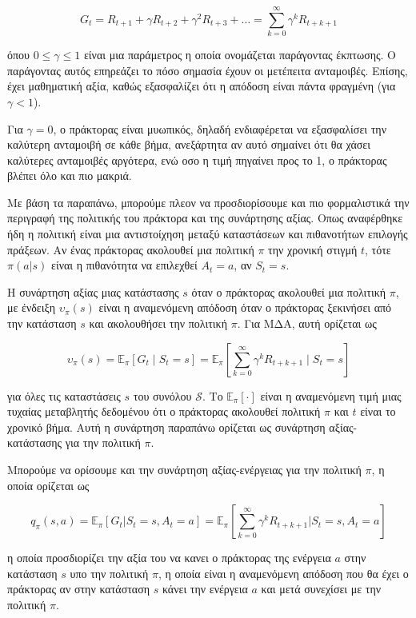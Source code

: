 \begin{equation}
    G_t = R_{t+1} + γ R_{t+2} + γ^2 R_{t+3} + \ldots = \sum_{k=0}^{\infty}γ^k R_{t+k+1}
\end{equation}

όπου $ 0 \leq γ \leq 1$ είναι μια παράμετρος η οποία ονομάζεται παράγοντας έκπτωσης.
Ο παράγοντας αυτός επηρεάζει το πόσο σημασία έχουν οι μετέπειτα ανταμοιβές.
Επίσης, έχει μαθηματική αξία, καθώς εξασφαλίζει ότι η απόδοση είναι πάντα φραγμένη (για $γ < 1$).

Για $γ = 0$, ο πράκτορας είναι μυωπικός, δηλαδή ενδιαφέρεται να εξασφαλίσει την καλύτερη ανταμοιβή σε κάθε βήμα,
ανεξάρτητα αν αυτό σημαίνει ότι θα χάσει καλύτερες ανταμοιβές αργότερα, ενώ οσο η τιμή πηγαίνει προς το 1,
ο πράκτορας βλέπει όλο και πιο μακριά.

Με βάση τα παραπάνω, μπορούμε πλεον να προσδιορίσουμε και πιο φορμαλιστικά την περιγραφή της πολιτικής του πράκτορα και της συνάρτησης αξίας.
Οπως αναφέρθηκε ήδη η πολιτική είναι μια αντιστοίχηση μεταξύ καταστάσεων και πιθανοτήτων επιλογής πράξεων.
Αν ένας πράκτορας ακολουθεί μια πολιτική $π$ την χρονική στιγμή $t$,
τότε $π(a|s)$ είναι η πιθανότητα να επιλεχθεί $A_t = a$, αν $S_t =s$.

Η συνάρτηση αξίας μιας κατάστασης $s$ όταν ο πράκτορας ακολουθεί μια πολιτική $π$,
με ένδειξη $υ_π(s)$ είναι η αναμενόμενη απόδοση όταν ο πράκτορας ξεκινήσει από την κατάσταση $s$
και ακολουθήσει την πολιτική $π$. Για ΜΔΑ, αυτή ορίζεται ως

\begin{equation}
    υ_π(s) = \mathbb{E}_π[G_t\;|\;S_t = s] = \mathbb{E}_π \left[ \sum_{k=0}^{\infty}γ^kR_{t+k+1}\;\bigg|\;S_t = s\right]
\end{equation}

για όλες τις καταστάσεις $s$ του συνόλου $\mathcal{S}$.
Το $\mathbb{E}_π[\cdot]$ είναι η αναμενόμενη τιμή μιας τυχαίας μεταβλητής δεδομένου ότι ο πράκτορας ακολουθεί πολιτική
$π$ και $t$ είναι το χρονικό βήμα. Αυτή η συνάρτηση παραπάνω ορίζεται ως συνάρτηση αξίας-κατάστασης για την πολιτική $π$.

Μπορούμε να ορίσουμε και την συνάρτηση αξίας-ενέργειας για την πολιτική $π$, η οποία ορίζεται ως

\begin{equation}
    q_π(s,a) = \mathbb{E}_π[G_t | S_t = s, A_t = a] = \mathbb{E}_π\left[ \sum_{k=0}^{\infty} γ^k R_{t+k+1} \bigg| S_t = s, A_t = a\right]
\end{equation}

η οποία προσδιορίζει την αξία του να κανει ο πράκτορας της ενέργεια $a$ στην κατάσταση $s$ υπο την πολιτική $π$,
η οποία είναι η αναμενόμενη απόδοση που θα έχει ο πράκτορας αν στην κατάσταση $s$ κάνει την ενέργεια $a$ και μετά συνεχίσει με την πολιτική $π$.

